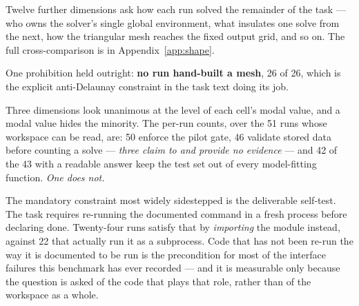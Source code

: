 Twelve further dimensions ask how each run solved the remainder of the task ---
who owns the solver's single global environment, what insulates one solve from
the next, how the triangular mesh reaches the fixed output grid, and so on. The
full cross-comparison is in Appendix~\ref{app:shape}.

One prohibition held outright: \textbf{no \Lthree{} run hand-built a mesh},
26 of 26, which is the explicit anti-Delaunay constraint in the task text doing
its job.

Three dimensions look unanimous at the level of each cell's modal value, and a
modal value hides the minority. The per-run counts, over the 51 runs whose
workspace can be read, are: 50 enforce the pilot gate, 46 validate stored data
before counting a solve --- \emph{three claim to and provide no evidence} ---
and 42 of the 43 with a readable answer keep the test set out of every
model-fitting function. \emph{One does not.}

The mandatory constraint most widely sidestepped is the deliverable self-test.
The task requires re-running the documented  command in a fresh
process before declaring done. Twenty-four runs satisfy that by \emph{importing}
the module instead, against 22 that actually run it as a subprocess. Code that
has not been re-run the way it is documented to be run is the precondition for
most of the interface failures this benchmark has ever recorded --- and it is
measurable only because the question is asked of the code that plays that role,
rather than of the workspace as a whole.
